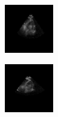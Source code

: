 \begin{figure}[htb]
\begin{subfigure}[b]{0.245\textwidth}
        \end{subfigure}%
        \begin{subfigure}[b]{0.245\textwidth}
                \centering
                \includegraphics[width=\linewidth]{img_seg/33_post}
        \end{subfigure}%
        \begin{subfigure}[b]{0.245\textwidth}
                \centering
                \includegraphics[width=\linewidth]{img_seg/37_post}
        \end{subfigure}
        

\end{figure}

